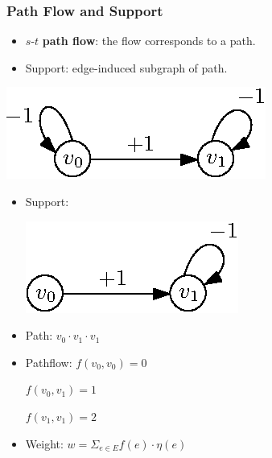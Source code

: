 \documentclass[11pt]{beamer}
\begin{document}
\begin{frame}\frametitle{Path Flow and Support}


\begin{itemize}

\item  $s$-$t$ \textbf{path flow}: the flow corresponds to a path.

\item Support: edge-induced subgraph of path.
\end{itemize}


\begin{example}
\begin{multicols}{2}

\includegraphics[scale=1]{wg2.eps}
\begin{itemize}

\item Support: 

\includegraphics[scale=1]{support.eps}

\item Path: $v_0\cdot v_1\cdot v_1$

\item Pathflow: $f(v_0,v_0) = 0$ 

$f(v_0,v_1) = 1$

$ f(v_1,v_1) = 2$

\item Weight: $w = \Sigma_{e\in E} f(e)\cdot \eta(e)$
\end{itemize}
\end{multicols}

\end{example}


\end{frame}
\end{document}
